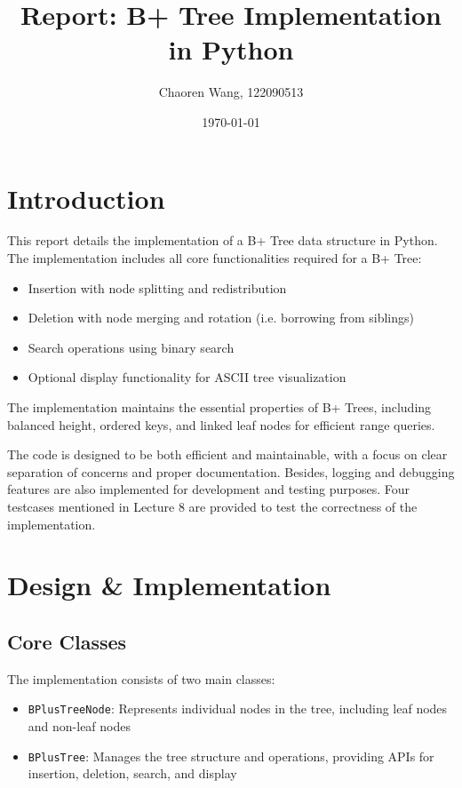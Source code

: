 \documentclass[11pt]{article}
\title{Report: B+ Tree Implementation in Python}
\author{Chaoren Wang, 122090513}
\date{\today}
\begin{document}
\maketitle

\section{Introduction}
This report details the implementation of a B+ Tree data structure in Python. The implementation includes all core functionalities required for a B+ Tree:
\begin{itemize}
    \item Insertion with node splitting and redistribution
    \item Deletion with node merging and rotation (i.e. borrowing from siblings)
    \item Search operations using binary search
    \item Optional display functionality for ASCII tree visualization
\end{itemize}

The implementation maintains the essential properties of B+ Trees, including balanced height, ordered keys, and linked leaf nodes for efficient range queries. 

The code is designed to be both efficient and maintainable, with a focus on clear separation of concerns and proper documentation. Besides, logging and debugging features are also implemented for development and testing purposes. Four testcases mentioned in Lecture 8 are provided to test the correctness of the implementation.

\section{Design \& Implementation}

\subsection{Core Classes}
The implementation consists of two main classes:
\begin{itemize}
    \item \texttt{BPlusTreeNode}: Represents individual nodes in the tree, including leaf nodes and non-leaf nodes
    \item \texttt{BPlusTree}: Manages the tree structure and operations, providing APIs for insertion, deletion, search, and display
\end{itemize}
\end{document}
